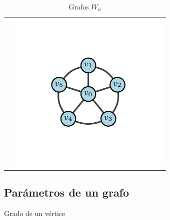 \begin{table}[H]
\begin{center}
\begin{tabular}{cc}
                    &
                    \includegraphics{Sections/Graphs/GraphsImages/GraphsWn/W5.pdf}
                \end{tabular}
              \caption{Grafos $W_n$}
              \label{tbl:grafosTn}
            \end{center}
        \end{table}
    \subsection{Parámetros de un grafo}
        \begin{definition}{Grado de un vértice}
            
        \end{definition}